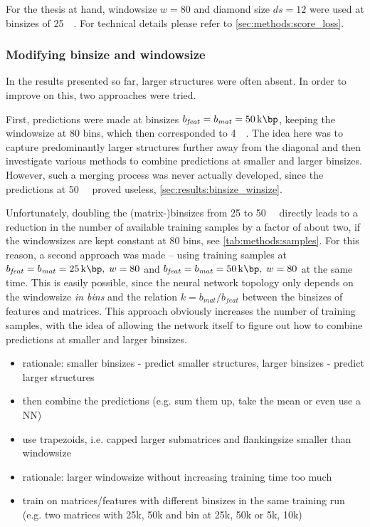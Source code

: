 For the thesis at hand, windowsize $w=80$ and diamond size $ds={12}$ were used at binsizes of \SI{25}{\kilo\bp}.
For technical details please refer to \cref{sec:methods:score_loss}.

\subsubsection{Modifying binsize and windowsize}
In the results presented so far, larger structures were often absent.
In order to improve on this, two approaches were tried.

First, predictions were made at binsizes $b_\mathit{feat} = b_\mathit{mat} = \SI{50}{\kilo\bp}$, 
keeping the windowsize at 80 bins, which then corresponded to \SI{4}{\mega\bp}.
The idea here was to capture predominantly larger structures further away from the diagonal and
then investigate various methods to combine predictions at smaller and larger binsizes.
However, such a merging process was never actually developed,
since the predictions at \SI{50}{\kilo\bp} proved useless, \cref{sec:results:binsize_winsize}.

Unfortunately, doubling the (matrix-)binsizes from 25 to \SI{50}{\kilo\bp} directly leads to a reduction in the number of available training samples by a factor of about two, 
if the windowsizes are kept constant at 80 bins, see \cref{tab:methods:samples}.
For this reason, a second approach was made -- using training samples at $b_\mathit{feat} = b_\mathit{mat} = \SI{25}{\kilo\bp},\;w=80$
and $b_\mathit{feat} = b_\mathit{mat} = \SI{50}{\kilo\bp},\;w=80$ at the same time.
This is easily possible, since the neural network topology only depends on the windowsize \emph{in bins} and the relation $k=b_\mathit{mat}/b_\mathit{feat}$
between the binsizes of features and matrices.
This approach obviously increases the number of training samples,
with the idea of allowing the network itself to figure out how to combine predictions at smaller and larger binsizes.


\begin{itemize}
 \item rationale: smaller binsizes - predict smaller structures, larger binsizes - predict larger structures
 \item then combine the predictions (e.g. sum them up, take the mean or even use a NN)
 \item use trapezoids, i.e. capped larger submatrices and flankingsize smaller than windowsize
 \item rationale: larger windowsize without increasing training time too much 
 \item train on matrices/features with different binsizes in the same training run (e.g. two matrices with 25k, 50k and bin at 25k, 50k or 5k, 10k)
 \end{itemize}
 
